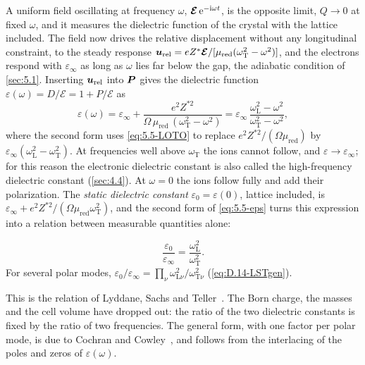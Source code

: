 A uniform field oscillating at frequency $\omega$, $\bm{\mathcal{E}}\,\mathrm{e}^{-\mathrm{i}\omega t}$, is the opposite limit, $Q \to 0$ at fixed $\omega$, and it measures the dielectric function of the crystal with the lattice included. The field now drives the relative displacement without any longitudinal constraint, to the steady response $\bm{u}_{\mathrm{rel}} = eZ^*\bm{\mathcal{E}}/[\mu_{\mathrm{red}}(\omega_{\mathrm{T}}^2 - \omega^2)]$, and the electrons respond with $\varepsilon_\infty$ as long as $\omega$ lies far below the gap, the adiabatic condition of \cref{sec:5.1}. Inserting $\bm{u}_{\mathrm{rel}}$ into $\bm{P}$ gives the dielectric function $\varepsilon(\omega) = D/\mathcal{E} = 1 + P/\mathcal{E}$ as
\begin{equation}
  \varepsilon(\omega) = \varepsilon_\infty + \frac{e^2Z^{*2}}{\Omega\,\mu_{\mathrm{red}}\,(\omega_{\mathrm{T}}^2 - \omega^2)}
  = \varepsilon_\infty\,\frac{\omega_{\mathrm{L}}^2 - \omega^2}{\omega_{\mathrm{T}}^2 - \omega^2} ,
  \label{eq:5.5-eps}
\end{equation}
where the second form uses \cref{eq:5.5-LOTO} to replace $e^2Z^{*2}/(\Omega\mu_{\mathrm{red}})$ by $\varepsilon_\infty(\omega_{\mathrm{L}}^2 - \omega_{\mathrm{T}}^2)$. At frequencies well above $\omega_{\mathrm{T}}$ the ions cannot follow, and $\varepsilon \to \varepsilon_\infty$; for this reason the electronic dielectric constant is also called the high-frequency dielectric constant (\cref{sec:4.4}). At $\omega = 0$ the ions follow fully and add their polarization. The \emph{static dielectric constant} $\varepsilon_0 = \varepsilon(0)$, lattice included, is $\varepsilon_\infty + e^2Z^{*2}/(\Omega\mu_{\mathrm{red}}\omega_{\mathrm{T}}^2)$, and the second form of \cref{eq:5.5-eps} turns this expression into a relation between measurable quantities alone:
\begin{keyresult}
\begin{equation}
  \frac{\varepsilon_0}{\varepsilon_\infty} = \frac{\omega_{\mathrm{L}}^2}{\omega_{\mathrm{T}}^2} .
  \label{eq:5.5-LST}
\end{equation}
For several polar modes, $\varepsilon_0/\varepsilon_\infty = \prod_\nu\omega_{\mathrm{L}\nu}^2/\omega_{\mathrm{T}\nu}^2$ (\cref{eq:D.14-LSTgen}).
\end{keyresult}
This is the relation of Lyddane, Sachs and Teller~\cite{lyddane1941polar}. The Born charge, the masses and the cell volume have dropped out: the ratio of the two dielectric constants is fixed by the ratio of two frequencies. The general form, with one factor per polar mode, is due to Cochran and Cowley~\cite{cochran1962dielectric}, and follows from the interlacing of the poles and zeros of $\varepsilon(\omega)$.

